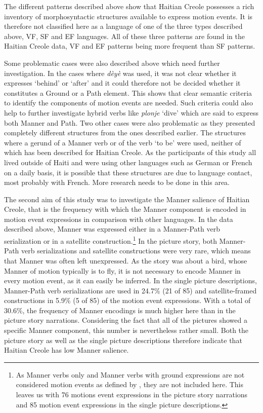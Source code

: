\documentclass[output=paper,colorlinks,citecolor=brown]{langscibook}
\begin{document}
The different patterns described above show that Haitian Creole possesses a rich inventory of morphosyntactic structures available to express motion events. It is therefore not classified here as a language of one of the three types described above, VF, SF and EF languages. All of these three patterns are found in the Haitian Creole data, VF and EF patterns being more frequent than SF patterns.

Some problematic cases were also described above which need further investigation. In the cases where \emph{dèyè} was used, it was not clear whether it expresses ‘behind’ or ‘after’ and it could therefore not be decided whether it constitutes a Ground or a Path element. This shows that clear semantic criteria to identify the components of motion events are needed. Such criteria could also help to further investigate hybrid verbs like \emph{plonje} ‘dive’ which are said to express both Manner and Path. Two other cases were also problematic as they presented completely different structures from the ones described earlier. The structures where a gerund of a Manner verb or of the verb `to be' were used, neither of which has been described for Haitian Creole. As the participants of this study all lived outside of Haiti and were using other languages such as German or French on a daily basis, it is possible that these structures are due to language contact, most probably with French. More research needs to be done in this area.

The second aim of this study was to investigate the Manner salience of Haitian Creole, that is the frequency with which the Manner component is encoded in motion event expressions in comparison with other languages. In the data described above, Manner was expressed either in a Manner-Path verb serialization or in a satellite construction.\footnote{As Manner verbs only and Manner verbs with ground expressions are not considered motion events as defined by \citet{Talmy_1985}, they are not included here. This leaves us with 76 motions event expressions in the picture story narrations and 85 motion event expressions in the single picture descriptions.} In the picture story, both Manner-Path verb serializations and satellite constructions were very rare, which means that Manner was often left unexpressed. As the story was about a bird, whose Manner of motion typically is to fly, it is not necessary to encode Manner in every motion event, as it can easily be inferred. In the single picture descriptions, Manner-Path verb serializations are used in 24.7\% (21 of 85) and satellite-framed constructions in 5.9\% (5 of 85) of the motion event expressions. With a total of 30.6\%, the frequency of Manner encodings is much higher here than in the picture story narrations. Considering the fact that all of the pictures showed a specific Manner component, this number is nevertheless rather small. Both the picture story as well as the single picture descriptions therefore indicate that Haitian Creole has low Manner salience.
\end{document}
